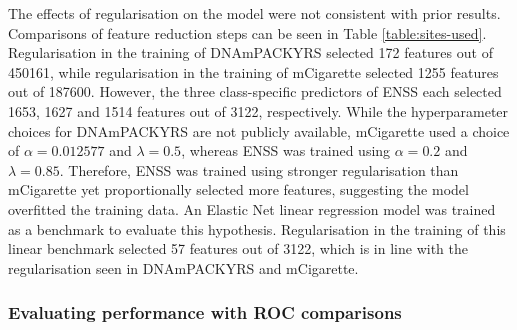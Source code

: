 \documentclass{article} %
\begin{document}
The effects of regularisation on the model were not consistent with prior results. Comparisons of feature reduction steps can be seen in Table \ref{table:sites-used}. Regularisation in the training of DNAmPACKYRS selected 172 features out of \num{450161}, while regularisation in the training of mCigarette selected \num{1255} features out of \num{187600}. However, the three class-specific predictors of ENSS each selected 1653, 1627 and 1514 features out of 3122, respectively. While the hyperparameter choices for DNAmPACKYRS are not publicly available, mCigarette used a choice of \(\alpha = 0.012577\) and \(\lambda = 0.5\), whereas ENSS was trained using \(\alpha = 0.2\) and \(\lambda = 0.85\). Therefore, ENSS was trained using stronger regularisation than mCigarette yet proportionally selected more features, suggesting the model overfitted the training data. An Elastic Net linear regression model was trained as a benchmark to evaluate this hypothesis. Regularisation in the training of this linear benchmark selected 57 features out of 3122, which is in line with the regularisation seen in DNAmPACKYRS and mCigarette.

\subsubsection{Evaluating performance with ROC comparisons}
\end{document}

